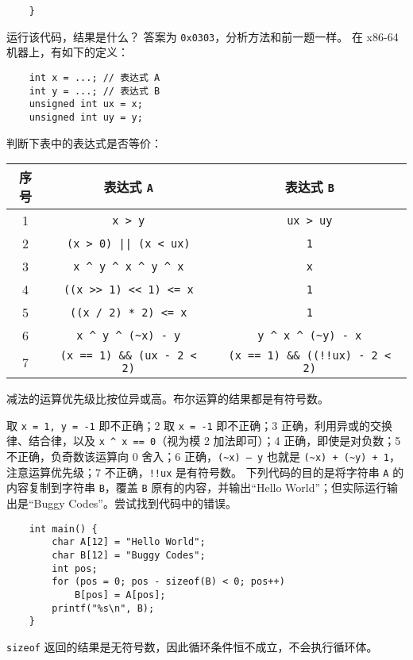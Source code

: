 \begin{problems}
\begin{verbatim}
    }
		\end{verbatim}
		运行该代码，结果是什么？
		\sol 答案为 \verb|0x0303|，分析方法和前一题一样。
		\pro 在 x86-64 机器上，有如下的定义：
		\begin{verbatim}
    int x = ...; // 表达式 A
    int y = ...; // 表达式 B
    unsigned int ux = x;
    unsigned int uy = y;
		\end{verbatim}
		判断下表中的表达式是否等价：
		\begin{table}[H]
			\centering
			\begin{tabular}{|c|c|c|}
				\hline
				序号 & 表达式 \verb|A| & 表达式 \verb|B| \\ \hline
				1 & \verb|x > y| & \verb|ux > uy| \\ \hline
				2 & \verb+(x > 0) || (x < ux)+ & \verb|1| \\ \hline
				3 & \verb|x ^ y ^ x ^ y ^ x| & \verb|x| \\ \hline
				4 & \verb|((x >> 1) << 1) <= x| & \verb|1| \\ \hline
				5 & \verb|((x / 2) * 2) <= x| & \verb|1| \\ \hline
				6 & \verb|x ^ y ^ (~x) - y| & \verb|y ^ x ^ (~y) - x| \\ \hline
				7 & \verb|(x == 1) && (ux - 2 < 2)| & \verb|(x == 1) && ((!!ux) - 2 < 2)| \\ \hline
			\end{tabular}
		\end{table}
		\begin{hint}
			减法的运算优先级比按位异或高。布尔运算的结果都是有符号数。
		\end{hint}
		 取 \verb|x = 1, y = -1| 即不正确；2 取 \verb|x = -1| 即不正确；3 正确，利用异或的交换律、结合律，以及 \verb|x ^ x == 0|（视为模 2 加法即可）；4 正确，即使是对负数；5 不正确，负奇数该运算向 0 舍入；6 正确，\verb|(~x) – y| 也就是 \verb|(~x) + (~y) + 1|，注意运算优先级；7 不正确，\verb|!!ux| 是有符号数。
		\pro 下列代码的目的是将字符串 \texttt{A} 的内容复制到字符串 \texttt{B}，覆盖 \texttt{B} 原有的内容，并输出“Hello World”；但实际运行输出是“Buggy Codes”。尝试找到代码中的错误。
		\begin{verbatim}
    int main() {
        char A[12] = "Hello World";
        char B[12] = "Buggy Codes";
        int pos;
        for (pos = 0; pos - sizeof(B) < 0; pos++)
            B[pos] = A[pos];
        printf("%s\n", B);
    }
		\end{verbatim}
		\sol \verb|sizeof| 返回的结果是无符号数，因此循环条件恒不成立，不会执行循环体。

\end{problems}
